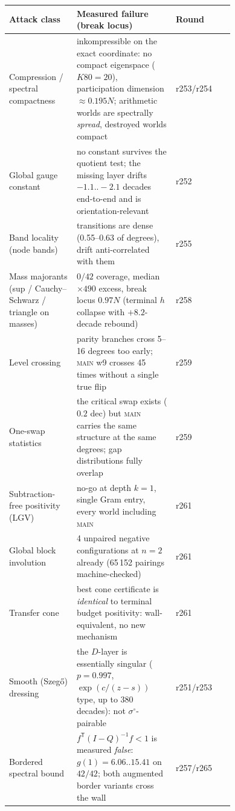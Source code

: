 \documentclass[11pt]{article}
\theoremstyle{definition}
\theoremstyle{remark}
\begin{document}
\begin{center}\small
\begin{tabular}{@{}p{0.30\linewidth}p{0.44\linewidth}l@{}}
\toprule
\textbf{Attack class} & \textbf{Measured failure (break locus)} & \textbf{Round}\\
\midrule
Compression / spectral compactness & inkompressible on the exact
coordinate: no compact eigenspace ($K80=20$), participation dimension
$\approx0.195N$; arithmetic worlds are spectrally \emph{spread}, destroyed
worlds compact & r253/r254\\
\addlinespace[2pt]
Global gauge constant & no constant survives the quotient test; the
missing layer drifts $-1.1..-2.1$ decades end-to-end and is
orientation-relevant & r252\\
\addlinespace[2pt]
Band locality (node bands) & transitions are dense (0.55--0.63 of
degrees), drift anti-correlated with them & r255\\
\addlinespace[2pt]
Mass majorants (sup / Cauchy--Schwarz / triangle on masses) & $0/42$
coverage, median $\times490$ excess, break locus $0.97N$ (terminal $h$
collapse with $+8.2$-decade rebound) & r258\\
\addlinespace[2pt]
Level crossing & parity branches cross 5--16 degrees too early;
\textsc{main} w9 crosses 45 times without a single true flip & r259\\
\addlinespace[2pt]
One-swap statistics & the critical swap exists ($0.2$ dec) but \textsc{main}
carries the same structure at the same degrees; gap distributions fully
overlap & r259\\
\addlinespace[2pt]
Subtraction-free positivity (LGV) & no-go at depth $k=1$, single Gram
entry, every world including \textsc{main} & r261\\
\addlinespace[2pt]
Global block involution & 4 unpaired negative configurations at $n=2$
already (65\,152 pairings machine-checked) & r261\\
\addlinespace[2pt]
Transfer cone & best cone certificate is \emph{identical} to terminal
budget positivity: wall-equivalent, no new mechanism & r261\\
\addlinespace[2pt]
Smooth (Szeg\H{o}) dressing & the $D$-layer is essentially singular
($p=0.997$, $\exp(c/(z-s))$ type, up to 380 decades): not
$\sigma^{\circ}$-pairable & r251/r253\\
\addlinespace[2pt]
Bordered spectral bound & $f^{\mathsf T}(I-Q)^{-1}f<1$ is measured
\emph{false}: $g(1)=6.06..15.41$ on $42/42$; both augmented border
variants cross the wall & r257/r265\\

\end{tabular}
\end{center}
\end{document}
